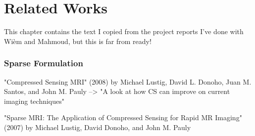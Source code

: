 \chapter{Related Works}



\iffalse

\color{red}
This chapter contains the text I copied from the project reports I've done with Wièm and Mahmoud, but this is far from ready!
\color{black}

\subsection{Sparse Formulation}


"Compressed Sensing MRI" (2008) by Michael Lustig, David L. Donoho, Juan M. Santos, and John M. Pauly --> "A look at how CS can improve on current imaging techniques"

"Sparse MRI: The Application of Compressed Sensing for Rapid MR Imaging" (2007) by Michael Lustig, David Donoho, and John M. Pauly

